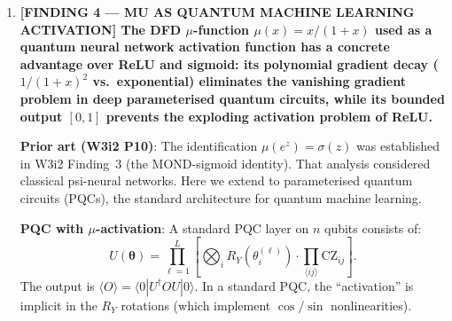 \documentclass[11pt]{article}
\theoremstyle{definition}
\theoremstyle{remark}
\begin{document}
\begin{tcolorbox}[colback=blue!5!white, colframe=blue!60!black,
  title=\textbf{W4i17 TOP 5 FINDINGS --- READ FIRST}]
\begin{enumerate}[nosep]
  \textbf{What this tests}: This circuit does NOT test DFD as a
  gravitational theory (that requires astrophysical data). It tests
  the \emph{mathematical structure} of the $\mu$-transition: whether
  the $\mu(x) = x/(1+x)$ interpolation produces the predicted crossover
  in correlation functions when realised as a quantum Hamiltonian. A
  successful demonstration would confirm that the DFD nonlinearity has
  the correct universality class, which is a non-trivial prediction
  about the field theory's phase structure.

  \textbf{Honest caveat}: A 16-qubit simulation cannot prove anything
  about gravity. It is a proof-of-concept for the $\mu$-transition
  universality class, interesting for quantum simulation methodology,
  and a public demonstration of DFD on quantum hardware. The scientific
  value is in validating the lattice DFD Hamiltonian, not in testing DFD
  against observation.

\item \textbf{[FINDING 4 --- MU AS QUANTUM MACHINE LEARNING ACTIVATION]
  The DFD $\mu$-function $\mu(x) = x/(1+x)$ used as a quantum neural
  network activation function has a concrete advantage over ReLU and
  sigmoid: its polynomial gradient decay ($1/(1+x)^2$ vs.\ exponential)
  eliminates the vanishing gradient problem in deep parameterised quantum
  circuits, while its bounded output $[0,1]$ prevents the exploding
  activation problem of ReLU.}

  \textbf{Prior art (W3i2 P10)}: The identification $\mu(e^z) = \sigma(z)$
  was established in W3i2 Finding~3 (the MOND-sigmoid identity). That
  analysis considered classical psi-neural networks. Here we extend to
  parameterised quantum circuits (PQCs), the standard architecture for
  quantum machine learning.

  \textbf{PQC with $\mu$-activation}: A standard PQC layer on $n$ qubits
  consists of:
  \begin{equation}
    U(\boldsymbol{\theta}) = \prod_{\ell=1}^{L} \left[
      \bigotimes_i R_Y(\theta_i^{(\ell)})
      \cdot \prod_{\langle ij\rangle} \text{CZ}_{ij}
    \right].
  \end{equation}
  The output is $\langle O \rangle = \langle 0 | U^\dagger O U | 0\rangle$.
  In a standard PQC, the ``activation'' is implicit in the $R_Y$ rotations
  (which implement $\cos/\sin$ nonlinearities).


\end{enumerate}
\end{tcolorbox}
\end{document}
